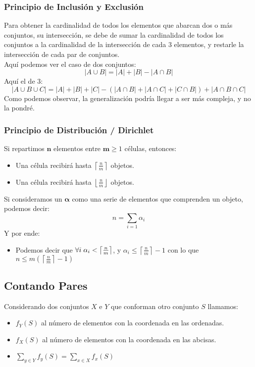 \subsubsection{Principio de Inclusión y Exclusión}
\noindent Para obtener la cardinalidad de todos los elementos que abarcan dos o más conjuntos, su intersección, se debe de sumar la cardinalidad de todos los conjuntos a la cardinalidad de la intersección de cada 3 elementos, y restarle la intersección de cada par de conjuntos.
\\Aquí podemos ver el caso de dos conjuntos:
\[
        \boxed{\left | A \cup B \right | = \left | A \right | + \left | B \right | - \left | A \cap B \right |}
\]
\noindent Aquí el de 3:
\[
        \boxed{\left | A \cup B \cup C \right | = \left | A \right | + \left | B \right |+ \left | C \right |-( \left | A \cap B \right | + \left | A \cap C \right | + \left | C \cap B \right |) + \left | A \cap B \cap C\right |}
\]
\noindent Como podemos observar, la generalización podría llegar a ser más compleja, y no la pondré.
\subsubsection{Principio de Distribución / Dirichlet}
\noindent Si repartimos \(\mathbf{n}\) elementos entre \(\mathbf{m}\geq 1\) células, entonces:
\begin{itemize}
        \item Una célula recibirá hasta \(\left \lceil \frac{n}{m} \right \rceil\) objetos.
        \item Una célula recibirá hasta \(\left \lfloor \frac{n}{m} \right \rfloor\) objetos.
\end{itemize}
\noindent Si consideramos un \(\mathbf{\alpha}\) como una serie de elementos que comprenden un objeto, podemos decir:
\[
        n = \sum_{i=1}\alpha_{i}
\]
\noindent Y por ende:
\begin{itemize}
        \item Podemos decir que \(\forall i\hspace{1mm}\alpha_i < \left \lceil \frac{n}{m} \right \rceil\), y \(\alpha_i \leq \left \lceil \frac{n}{m} \right \rceil -1\) con lo que \(n \leq m \left ( \left \lceil \frac{n}{m}\right \rceil -1\right )\)
\end{itemize}
\subsection{Contando Pares}
\noindent Considerando dos conjuntos \(X\) e \(Y\) que conforman otro conjunto \(S\) llamamos:
\begin{itemize}
        \item \(f_Y(S)\) al número de elementos con la coordenada en las ordenadas.
        \item \(f_X(S)\) al número de elementos con la coordenada en las abcisas.
        \item \(\sum_{y \in Y} f_y(S) =  \sum_{x \in X} f_x(S)\)
\end{itemize}
